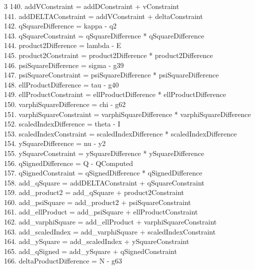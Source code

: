 \documentclass[10pt]{article}
\begin{document}
\begin{multicols}{3}
140. addVConstraint = addDConstraint + vConstraint\\
141. addDELTAConstraint = addVConstraint + deltaConstraint\\
142. qSquareDifference = kappa - q2\\
143. qSquareConstraint = qSquareDifference * qSquareDifference\\
144. product2Difference = lambda - E\\
145. product2Constraint = product2Difference * product2Difference\\
146. psiSquareDifference = sigma - g39\\
147. psiSquareConstraint = psiSquareDifference * psiSquareDifference\\
148. ellProductDifference = tau - g40\\
149. ellProductConstraint = ellProductDifference * ellProductDifference\\
150. varphiSquareDifference = chi - g62\\
151. varphiSquareConstraint = varphiSquareDifference * varphiSquareDifference\\
152. scaledIndexDifference = theta - I\\
153. scaledIndexConstraint = scaledIndexDifference * scaledIndexDifference\\
154. ySquareDifference = nu - y2\\
155. ySquareConstraint = ySquareDifference * ySquareDifference\\
156. qSignedDifference = Q - QComputed\\
157. qSignedConstraint = qSignedDifference * qSignedDifference\\
158. add\_qSquare = addDELTAConstraint + qSquareConstraint\\
159. add\_product2 = add\_qSquare + product2Constraint\\
160. add\_psiSquare = add\_product2 + psiSquareConstraint\\
161. add\_ellProduct = add\_psiSquare + ellProductConstraint\\
162. add\_varphiSquare = add\_ellProduct + varphiSquareConstraint\\
163. add\_scaledIndex = add\_varphiSquare + scaledIndexConstraint\\
164. add\_ySquare = add\_scaledIndex + ySquareConstraint\\
165. add\_qSigned = add\_ySquare + qSignedConstraint\\
166. deltaProductDifference = N - g63\\

\end{multicols}
\end{document}
